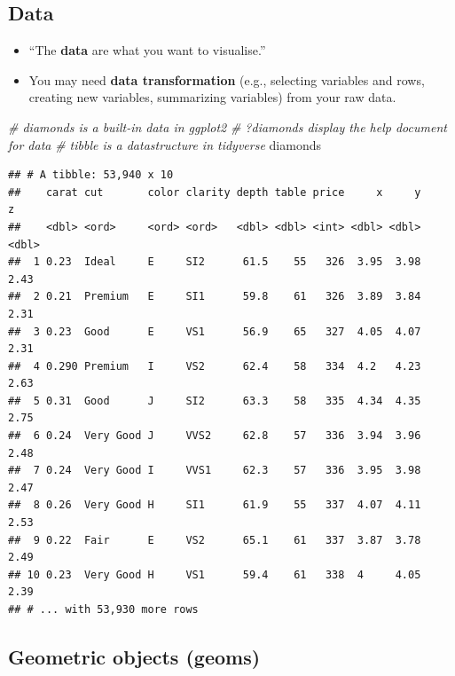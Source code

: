 \documentclass[]{book}
\newenvironment{Shaded}{\begin{snugshade}}{\end{snugshade}}
\newcommand{\CommentTok}[1]{\textcolor[rgb]{0.56,0.35,0.01}{\textit{#1}}}
\newcommand{\NormalTok}[1]{#1}
\providecommand{\tightlist}{%
  \setlength{\itemsep}{0pt}\setlength{\parskip}{0pt}}
\begin{document}
\hypertarget{data}{%
\subsection{Data}\label{data}}

\begin{itemize}
\tightlist
\item
  ``The \textbf{data} are what you want to visualise.'' \citep{ggplot2}
\item
  You may need \textbf{data transformation} (e.g., selecting variables and rows, creating new variables, summarizing variables) from your raw data.
\end{itemize}

\begin{Shaded}
\begin{Highlighting}[]
\CommentTok{# diamonds is a built-in data in ggplot2}
\CommentTok{# ?diamonds display the help document for data }
\CommentTok{# tibble is a datastructure in tidyverse }
\NormalTok{diamonds}
\end{Highlighting}
\end{Shaded}

\begin{verbatim}
## # A tibble: 53,940 x 10
##    carat cut       color clarity depth table price     x     y     z
##    <dbl> <ord>     <ord> <ord>   <dbl> <dbl> <int> <dbl> <dbl> <dbl>
##  1 0.23  Ideal     E     SI2      61.5    55   326  3.95  3.98  2.43
##  2 0.21  Premium   E     SI1      59.8    61   326  3.89  3.84  2.31
##  3 0.23  Good      E     VS1      56.9    65   327  4.05  4.07  2.31
##  4 0.290 Premium   I     VS2      62.4    58   334  4.2   4.23  2.63
##  5 0.31  Good      J     SI2      63.3    58   335  4.34  4.35  2.75
##  6 0.24  Very Good J     VVS2     62.8    57   336  3.94  3.96  2.48
##  7 0.24  Very Good I     VVS1     62.3    57   336  3.95  3.98  2.47
##  8 0.26  Very Good H     SI1      61.9    55   337  4.07  4.11  2.53
##  9 0.22  Fair      E     VS2      65.1    61   337  3.87  3.78  2.49
## 10 0.23  Very Good H     VS1      59.4    61   338  4     4.05  2.39
## # ... with 53,930 more rows
\end{verbatim}

\hypertarget{geometric-objects-geoms}{%
\subsection{\texorpdfstring{Geometric objects (\textbf{geoms})}{Geometric objects (geoms)}}\label{geometric-objects-geoms}}
\end{document}
